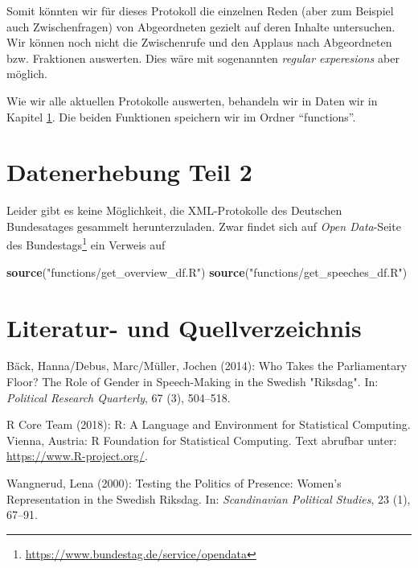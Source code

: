 \documentclass[oneside, 12pt]{scrbook}
\newenvironment{Shaded}{\begin{snugshade}}{\end{snugshade}}
\newcommand{\KeywordTok}[1]{\textcolor[rgb]{0.13,0.29,0.53}{\textbf{#1}}}
\newcommand{\NormalTok}[1]{#1}
\newcommand{\StringTok}[1]{\textcolor[rgb]{0.31,0.60,0.02}{#1}}
\theoremstyle{definition}
\theoremstyle{definition}
\theoremstyle{definition}
\theoremstyle{remark}
\begin{document}
Somit könnten wir für dieses Protokoll die einzelnen Reden (aber zum
Beispiel auch Zwischenfragen) von Abgeordneten gezielt auf deren Inhalte
untersuchen. Wir können noch nicht die Zwischenrufe und den Applaus nach
Abgeordneten bzw. Fraktionen auswerten. Dies wäre mit sogenannten
\emph{regular experesions} aber möglich.

Wie wir alle aktuellen Protokolle auswerten, behandeln wir in Daten wir
in Kapitel \ref{data-02}. Die beiden Funktionen speichern wir im Ordner
``functions''.

\hypertarget{data-02}{%
\chapter{Datenerhebung Teil 2}\label{data-02}}

Leider gibt es keine Möglichkeit, die XML-Protokolle des Deutschen
Bundesatages gesammelt herunterzuladen. Zwar findet sich auf \emph{Open
Data}-Seite des Bundestags\footnote{\url{https://www.bundestag.de/service/opendata}}
ein Verweis auf

\begin{Shaded}
\begin{Highlighting}[]
\KeywordTok{source}\NormalTok{(}\StringTok{"functions/get_overview_df.R"}\NormalTok{)}
\KeywordTok{source}\NormalTok{(}\StringTok{"functions/get_speeches_df.R"}\NormalTok{)}
\end{Highlighting}
\end{Shaded}

\hypertarget{literatur--und-quellverzeichnis}{%
\chapter*{Literatur- und
Quellverzeichnis}\label{literatur--und-quellverzeichnis}}

\hypertarget{refs}{}
\leavevmode\hypertarget{ref-back_2014}{}%
Bäck, Hanna/Debus, Marc/Müller, Jochen (2014): Who Takes the
Parliamentary Floor? The Role of Gender in Speech-Making in the Swedish
"Riksdag". In: \emph{Political Research Quarterly}, 67 (3), 504--518.

\leavevmode\hypertarget{ref-rcoreteam_2018}{}%
R Core Team (2018): R: A Language and Environment for Statistical
Computing. Vienna, Austria: R Foundation for Statistical Computing. Text
abrufbar unter: \url{https://www.R-project.org/}.

\leavevmode\hypertarget{ref-wangnerud_2000}{}%
Wangnerud, Lena (2000): Testing the Politics of Presence: Women's
Representation in the Swedish Riksdag. In: \emph{Scandinavian Political
Studies}, 23 (1), 67--91.
\end{document}
